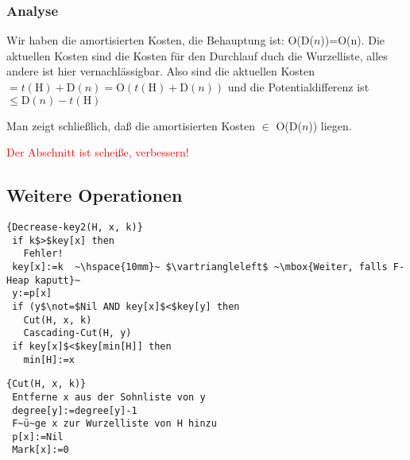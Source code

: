 \documentclass[ngerman,draft,parskip=half*,twoside]{scrreprt}
\theoremstyle{break}
\begin{document}
\subsubsection{Analyse}
Wir haben die amortisierten Kosten, die Behauptung ist: O(D($n$))=O(\log n). Die aktuellen Kosten sind die Kosten für den
Durchlauf duch die Wurzelliste, alles andere ist hier vernachlässigbar. Also sind die aktuellen Kosten
$=t(\mbox{H})+\mbox{D}(n)=\mbox{O}(t(\mbox{H})+\mbox{D}(n))$ und die Potentialdifferenz ist $\leq
\mbox{D}(n)-t(\mbox{H})$

Man zeigt schließlich, daß die amortisierten Kosten $\in$ O(D($n$)) liegen.

\textcolor{red}{Der Abschnitt ist scheiße, verbessern!}

\subsection{Weitere Operationen}
\begin{Algorithmus}[H]
\begin{lstlisting}[frame=tlrb, mathescape=true, title=\textsc{Decrease-Key\textnormal{(H, x, k)}}, gobble=1]{Decrease-key2(H, x, k)}
 if k$>$key[x] then
   Fehler!
 key[x]:=k  ~\hspace{10mm}~ $\vartriangleleft$ ~\mbox{Weiter, falls F-Heap kaputt}~ 
 y:=p[x]
 if (y$\not=$Nil AND key[x]$<$key[y] then
   Cut(H, x, k)
   Cascading-Cut(H, y)
 if key[x]$<$key[min[H]] then
   min[H]:=x  
\end{lstlisting}
\end{Algorithmus}

\begin{Algorithmus}[H]
\begin{lstlisting}[frame=tlrb, mathescape=true, title=\textsc{Cut\textnormal{(H, x, k)}}, gobble=1]{Cut(H, x, k)}
 Entferne x aus der Sohnliste von y
 degree[y]:=degree[y]-1
 F~ü~ge x zur Wurzelliste von H hinzu
 p[x]:=Nil
 Mark[x]:=0 
\end{lstlisting}
\end{Algorithmus}
\end{document}
